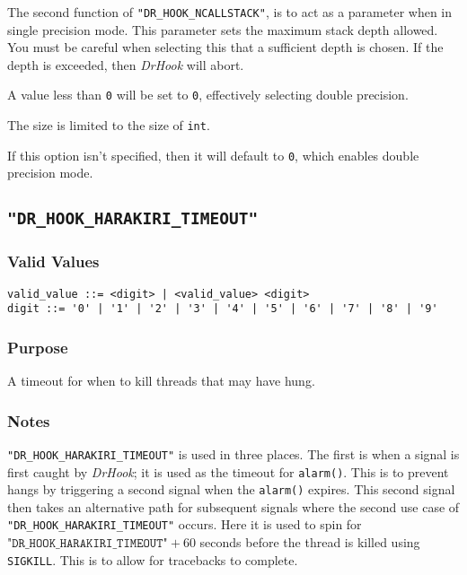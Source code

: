 The second function of \texttt{"DR\_HOOK\_NCALLSTACK"}, is to act as a parameter when in single precision mode. This parameter sets the maximum stack depth allowed. You must be careful when selecting this that a sufficient depth is chosen. If the depth is exceeded, then \textit{DrHook} will abort.

A value less than \verb|0| will be set to \verb|0|, effectively selecting double precision.

The size is limited to the size of \verb|int|.

If this option isn't specified, then it will default to \verb|0|, which enables double precision mode.



\subsection{\texttt{"DR\_HOOK\_HARAKIRI\_TIMEOUT"}}
\label{section:flags:DR_HOOK_HARAKIRI_TIMEOUT}
\vspace{-2ex}
\subsubsection{Valid Values}
\vspace{-2ex}
\verb+valid_value ::= <digit> | <valid_value> <digit> + \\
\verb+digit ::= '0' | '1' | '2' | '3' | '4' | '5' | '6' | '7' | '8' | '9'+

\vspace{-2ex}
\subsubsection{Purpose}
\vspace{-2ex}
A timeout for when to kill threads that may have hung.

\vspace{-2ex}
\subsubsection{Notes}
\vspace{-2ex}
\texttt{"DR\_HOOK\_HARAKIRI\_TIMEOUT"} is used in three places. The first is when a signal is first caught by \textit{DrHook}; it is used as the timeout for \texttt{alarm()}. This is to prevent hangs by triggering a second signal when the \texttt{alarm()} expires. This second signal then takes an alternative path for subsequent signals where the second use case of \texttt{"DR\_HOOK\_HARAKIRI\_TIMEOUT"} occurs. Here it is used to spin for $\texttt{"DR\_HOOK\_HARAKIRI\_TIMEOUT"} + 60$ seconds before the thread is killed using \texttt{SIGKILL}. This is to allow for tracebacks to complete.

